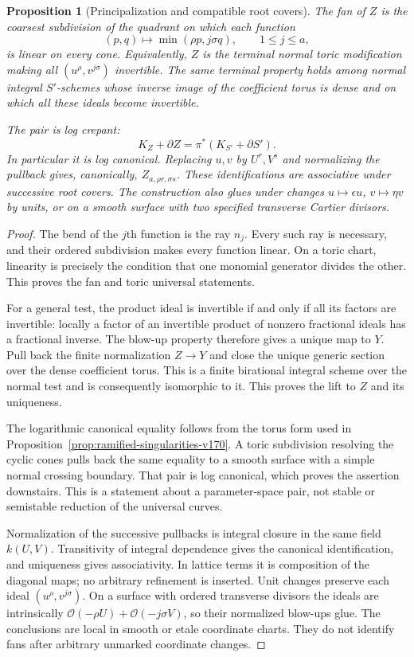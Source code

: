 \documentclass[11pt,reqno]{amsart}
\numberwithin{equation}{section}
\newtheorem{proposition}[theorem]{Proposition}
\theoremstyle{definition}\newtheorem{definition}[theorem]{Definition}
\theoremstyle{remark}\newtheorem{remark}[theorem]{Remark}
\newcommand{\OO}{\mathcal O}\newcommand{\II}{\mathcal I}
\begin{document}
\begin{proposition}[Principalization and compatible root covers]
\label{prop:log-compatibility-v170}
The fan of $Z$ is the coarsest subdivision of the quadrant on which
each function
\[
 (p,q)\longmapsto\min(\rho p,j\sigma q),\qquad1\leq j\leq a,
\]
is linear on every cone. Equivalently, $Z$ is the terminal normal
toric modification making all $(u^\rho,v^{j\sigma})$ invertible.
The same terminal property holds among normal integral $S'$-schemes
whose inverse image of the coefficient torus is dense and on which
all these ideals become invertible.

The pair is log crepant:
\[
 K_Z+\partial Z=\pi^*(K_{S'}+\partial S').
\]
In particular it is log canonical. Replacing $u,v$ by
$U^r,V^s$ and normalizing the pullback gives, canonically,
$Z_{a,\rho r,\sigma s}$. These identifications are associative under
successive root covers. The construction also glues under changes
$u\mapsto\epsilon u$, $v\mapsto\eta v$ by units, or on a smooth
surface with two specified transverse Cartier divisors.
\end{proposition}
\begin{proof}
The bend of the $j$th function is the ray $n_j$. Every such ray is
necessary, and their ordered subdivision makes every function
linear. On a toric chart, linearity is precisely the condition that
one monomial generator divides the other. This proves the fan and
toric universal statements.

For a general test, the product ideal is invertible if and only if
all its factors are invertible: locally a factor of an invertible
product of nonzero fractional ideals has a fractional inverse.
The blow-up property therefore gives a unique map to $Y$. Pull
back the finite normalization $Z\to Y$ and close the unique generic
section over the dense coefficient torus. This is a finite birational
integral scheme over the normal test and is consequently isomorphic
to it. This proves the lift to $Z$ and its uniqueness.

The logarithmic canonical equality follows from the torus form
used in Proposition~\ref{prop:ramified-singularities-v170}. A toric
subdivision resolving the cyclic cones pulls back the same equality
to a smooth surface with a simple normal crossing boundary. That
pair is log canonical, which proves the assertion downstairs. This
is a statement about a parameter-space pair, not stable or semistable
reduction of the universal curves.

Normalization of the successive pullbacks is integral closure in
the same field $k(U,V)$. Transitivity of integral dependence gives
the canonical identification, and uniqueness gives associativity.
In lattice terms it is composition of the diagonal maps; no
arbitrary refinement is inserted. Unit changes preserve each ideal
$(u^\rho,v^{j\sigma})$. On a surface with ordered transverse
divisors the ideals are intrinsically
$\OO(-\rho U)+\OO(-j\sigma V)$, so their normalized blow-ups glue.
The conclusions are local in smooth or etale coordinate charts.
They do not identify fans after arbitrary unmarked coordinate changes.
\end{proof}
\end{document}
